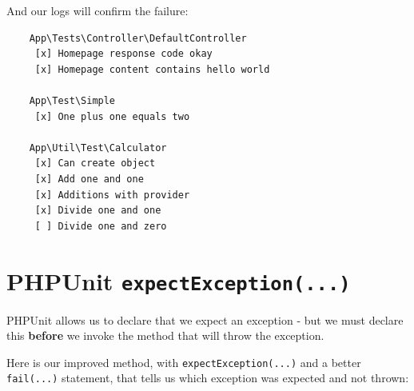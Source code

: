 \documentclass[a4paperpaper,openright]{book}
\newenvironment{Shaded}{}{}
\newcommand{\CommentTok}[1]{\textcolor[rgb]{0.38,0.63,0.69}{\textit{#1}}}
\newcommand{\DecValTok}[1]{\textcolor[rgb]{0.25,0.63,0.44}{#1}}
\newcommand{\KeywordTok}[1]{\textcolor[rgb]{0.00,0.44,0.13}{\textbf{#1}}}
\newcommand{\NormalTok}[1]{#1}
\newcommand{\OtherTok}[1]{\textcolor[rgb]{0.00,0.44,0.13}{#1}}
\newcommand{\StringTok}[1]{\textcolor[rgb]{0.25,0.44,0.63}{#1}}
\begin{document}
And our logs will confirm the failure:

\begin{verbatim}
    App\Tests\Controller\DefaultController
     [x] Homepage response code okay
     [x] Homepage content contains hello world

    App\Test\Simple
     [x] One plus one equals two

    App\Util\Test\Calculator
     [x] Can create object
     [x] Add one and one
     [x] Additions with provider
     [x] Divide one and one
     [ ] Divide one and zero
\end{verbatim}

\hypertarget{phpunit-expectexception...}{%
\section{\texorpdfstring{PHPUnit
\texttt{expectException(...)}}{PHPUnit expectException(...)}}\label{phpunit-expectexception...}}

PHPUnit allows us to declare that we expect an exception - but we must
declare this \textbf{before} we invoke the method that will throw the
exception.

Here is our improved method, with \texttt{expectException(...)} and a
better \texttt{fail(...)} statement, that tells us which exception was
expected and not thrown:

\begin{Shaded}
\end{Shaded}
\end{document}

